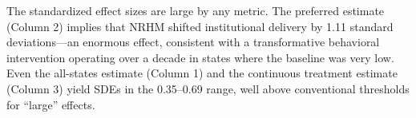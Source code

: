 \documentclass[12pt]{article}
\begin{document}
The standardized effect sizes are large by any metric. The preferred estimate (Column 2) implies that NRHM shifted institutional delivery by 1.11 standard deviations---an enormous effect, consistent with a transformative behavioral intervention operating over a decade in states where the baseline was very low. Even the all-states estimate (Column 1) and the continuous treatment estimate (Column 3) yield SDEs in the 0.35--0.69 range, well above conventional thresholds for ``large'' effects.
\end{document}
